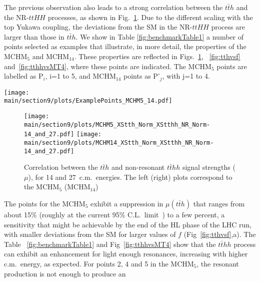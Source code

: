 The previous observation also leads to a strong correlation between the $t\bar{t}h$ and the NR-$ttHH$ processes, as shown in Fig.~\ref{fig:nrtthhvstth}. Due to the different scaling with the top Yukawa coupling, the deviations from the SM in the NR-$ttHH$ process are larger than those in $t\bar{t}h$.
\label{benchmarks}
We show in Table \ref{fig:benchmarkTable1} 
a number of points selected as examples that illustrate, in
more detail, the properties of the MCHM$_5$ and MCHM$_{14}$.  
These properties are reflected in Figs.~\ref{fig:nrtthhvstth}, ~\ref{fig:tthvsf} and~\ref{fig:tthhvsMT4}, where these points are indicated. The MCHM$_5$ points are labelled as P$_i$, i=1 to 5, and MCHM$_{14}$ points as P'$_j$, with j=1 to 4.
%
\begin{table}[t]
\centering
\texttt{[image: \\main/section9/plots/ExamplePoints\_MCHM5\_14.pdf]}
\caption{Sample points for MCHM$_5$ with M$_1$ M$_4$ same sign and opposite sign and for MCHM$_{14}$ with M$_1$ and M$_4$ both $<0$ and $\mu({\rm $ttH$})>1$.}
\label{fig:benchmarkTable1}
\end{table}
%
\begin{figure}[t]
\centering
\texttt{[image: \\main/section9/plots/MCHM5\_XStth\_Norm\_XStthh\_NR\_Norm-14\_and\_27.pdf]}
\hspace{1.5cm}
\texttt{[image: \\main/section9/plots/MCHM14\_XStth\_Norm\_XStthh\_NR\_Norm-14\_and\_27.pdf]}
\caption{Correlation between the $t\bar{t}h$ and
non-resonant $t\bar{t}hh$ signal strengths ($\mu$), for 14 and 27~\UTeV c.m.~energies. The left (right) plots correspond to the MCHM$_5$ (MCHM$_{14}$)}
\label{fig:nrtthhvstth}
\end{figure}
%
The points for the MCHM$_5$ exhibit a suppression in $\mu(t\bar{t}h)$ that ranges from about 15\% (roughly at the current
95\% C.L.~limit~\cite{Aaboud:2018urx, Sirunyan:2018hoz}) to a few
percent, a sensitivity that might be achievable by the end of the HL
phase of the LHC run, with smaller deviations from the SM for larger values of $f$ (Fig~\ref{fig:tthvsf},a). The Table ~\ref{fig:benchmarkTable1} and Fig~\ref{fig:tthhvsMT4} show that the
$t\bar{t}hh$ process can exhibit an enhancement for light enough
resonances, increasing with higher c.m.~energy, as expected. For points 2, 4 and 5 in the MCHM$_{5}$, the resonant production is not enough to produce an

